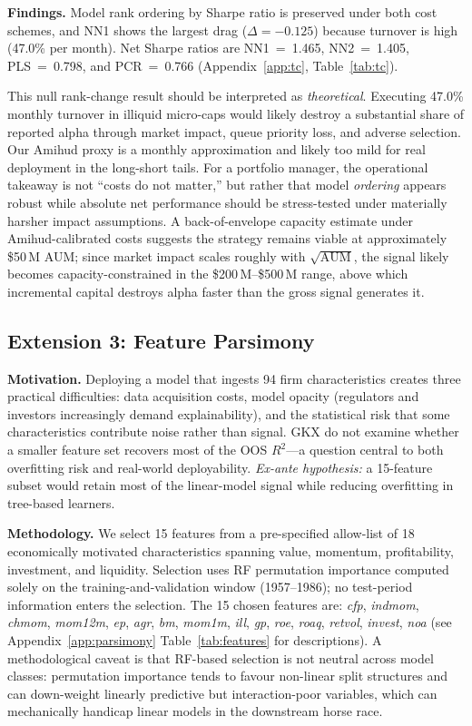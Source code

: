 \documentclass[11pt,a4paper]{article}
\begin{document}
\vspace{4pt}
\textbf{Findings.} Model rank ordering by Sharpe ratio is preserved under both cost schemes, and NN1 shows the largest drag ($\Delta = -0.125$) because turnover is high (47.0\% per month). Net Sharpe ratios are NN1~=~1.465, NN2~=~1.405, PLS~=~0.798, and PCR~=~0.766 (Appendix~\ref{app:tc}, Table~\ref{tab:tc}).

This null rank-change result should be interpreted as \textit{theoretical}. Executing 47.0\% monthly turnover in illiquid micro-caps would likely destroy a substantial share of reported alpha through market impact, queue priority loss, and adverse selection. Our Amihud proxy is a monthly approximation and likely too mild for real deployment in the long-short tails. For a portfolio manager, the operational takeaway is not ``costs do not matter,'' but rather that model \textit{ordering} appears robust while absolute net performance should be stress-tested under materially harsher impact assumptions. A back-of-envelope capacity estimate under Amihud-calibrated costs suggests the strategy remains viable at approximately \$50\,M AUM; since market impact scales roughly with $\sqrt{\text{AUM}}$, the signal likely becomes capacity-constrained in the \$200\,M--\$500\,M range, above which incremental capital destroys alpha faster than the gross signal generates it.

\subsection{Extension 3: Feature Parsimony}

\textbf{Motivation.} Deploying a model that ingests 94 firm characteristics creates three practical difficulties: data acquisition costs, model opacity (regulators and investors increasingly demand explainability), and the statistical risk that some characteristics contribute noise rather than signal. GKX do not examine whether a smaller feature set recovers most of the OOS $R^2$---a question central to both overfitting risk and real-world deployability. \textit{Ex-ante hypothesis:} a 15-feature subset would retain most of the linear-model signal while reducing overfitting in tree-based learners.

\vspace{4pt}
\textbf{Methodology.} We select 15 features from a pre-specified allow-list of 18 economically motivated characteristics spanning value, momentum, profitability, investment, and liquidity. Selection uses RF permutation importance computed solely on the training-and-validation window (1957--1986); no test-period information enters the selection. The 15 chosen features are: \textit{cfp}, \textit{indmom}, \textit{chmom}, \textit{mom12m}, \textit{ep}, \textit{agr}, \textit{bm}, \textit{mom1m}, \textit{ill}, \textit{gp}, \textit{roe}, \textit{roaq}, \textit{retvol}, \textit{invest}, \textit{noa} (see Appendix~\ref{app:parsimony} Table~\ref{tab:features} for descriptions). A methodological caveat is that RF-based selection is not neutral across model classes: permutation importance tends to favour non-linear split structures and can down-weight linearly predictive but interaction-poor variables, which can mechanically handicap linear models in the downstream horse race.
\end{document}
